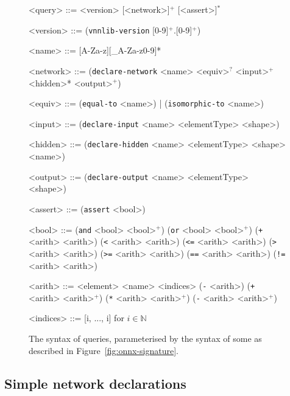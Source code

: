 \begin{figure}[p]
	\setlength{\grammarindent}{6.5em}
	
	\begin{grammar}
	<query> ::= <version> [<network>]$^+$ [<assert>]$^*$
	
	<version> ::= (\texttt{vnnlib-version} [0-9]$^+$.[0-9]$^+$)
	
	<name> ::= [A-Za-z][\_A-Za-z0-9]*
		
	<network> ::= (\texttt{declare-network} <name> <equiv>$^?$ <input>$^+$ <hidden>* <output>$^+$)
	
	<equiv> ::= (\texttt{equal-to} <name>) | (\texttt{isomorphic-to} <name>)
	
	<input> ::= (\texttt{declare-input} <name> <elementType> <shape>)
	
	<hidden> ::= (\texttt{declare-hidden} <name> <elementType> <shape> <name>)
	
	<output> ::= (\texttt{declare-output} <name> <elementType> <shape>)
	
	<assert> ::= (\texttt{assert} <bool>)
	
	<bool> ::= (\texttt{and} <bool> <bool>$^+$)
	\alt (\texttt{or} <bool> <bool>$^+$)
	\alt (\texttt{+} <arith> <arith>)
	\alt (\texttt{\textless} <arith> <arith>)
	\alt (\texttt{\textless=} <arith> <arith>)
	\alt (\texttt{\textgreater} <arith> <arith>)
	\alt (\texttt{\textgreater=} <arith> <arith>)
	\alt (\texttt{==} <arith> <arith>)
	\alt (\texttt{!=} <arith> <arith>)
	
	<arith> ::= <element>
	\alt <name> <indices>
	\alt (\texttt{-} <arith>)
	\alt (\texttt{+} <arith> <arith>$^+$)
	\alt (\texttt{*} <arith> <arith>$^+$)
	\alt (\texttt{-} <arith> <arith>$^+$)
	
	<indices> ::= [i, ..., i] for $i \in \mathbb{N}$
	\end{grammar}
	\vspace{-1em}
    \caption{The syntax of \vnnlib{} queries, parameterised by the syntax of some \networkTheory{} as described in Figure~\ref{fig:onnx-signature}. }
    \label{fig:vnnlib-syntax}
\end{figure}

\subsection{Simple network declarations}
\label{sec:network-declarations}

